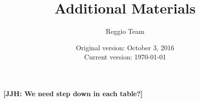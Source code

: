 

\setcounter{table}{0}
\renewcommand{\thetable}{A\arabic{table}}
\setcounter{figure}{0}
\renewcommand{\thefigure}{A\arabic{figure}}





\title{\Large \textbf{Additional Materials}}
\author{\normalsize Reggio Team}
\date{\normalsize Original version: October 3, 2016 \\ Current version: \today}
\maketitle

\textbf{[JJH: We need step down in each table?]}

\tableofcontents

\doublespacing

